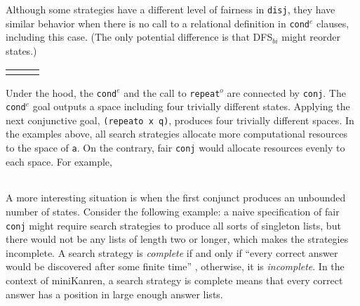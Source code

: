 \documentclass[acmlarge]{acmart}
\newcommand{\conde}{\texttt{cond$^e$}}
\newcommand{\conj}{\texttt{conj}}
\newcommand{\disj}{\texttt{disj}}
\newcommand{\repeato}{\texttt{repeat$^o$}}
\newcommand{\DFSbi}[0]{DFS$_{bi}$}
\begin{document}
Although some strategies have a different level of fairness in \disj{}, they 
have similar behavior when there is no call to a relational definition 
in \conde{} clauses, including this case. (The only potential difference is 
that \DFSbi{} might reorder states.)

\begin{center}
\begin{tabular}{l|c|r}
     &
     &
     \\
\end{tabular}
\end{center}

Under the hood, the \conde{} and the call to \repeato{} are connected by 
\conj{}. The \conde{} goal outputs a space including four trivially 
different states. 
Applying the next conjunctive goal, \texttt{(repeato x q)}, produces four 
trivially different spaces.
In the examples above, all search strategies allocate more computational 
resources to the space of \texttt{a}. On the contrary, fair \conj{} 
would allocate resources evenly to each space. For example,

\begin{center}
	\begin{tabular}{c}
		
	\end{tabular}
\end{center}

A more interesting situation is when the first conjunct produces an unbounded
number of states. Consider the following example: a naive specification of 
fair \conj{} 
might require search strategies to produce all sorts of singleton lists, but 
there
would not be any lists of length two or longer, which makes the strategies 
incomplete. 
A search strategy is \emph{complete} if and only if ``every correct answer 
would be discovered after some finite time'' \cite{seres1999algebra}, 
otherwise, it is \emph{incomplete}. In the 
context of miniKanren, a search strategy is complete means that every correct 
answer has a position in large enough answer lists.

\begin{center}
	\begin{tabular}{c}
		
	\end{tabular}
\end{center}
\end{document}
